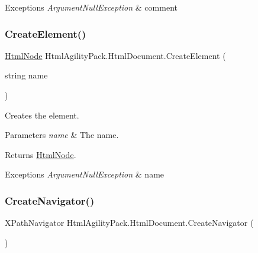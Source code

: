 \begin{DoxyExceptions}{Exceptions}
{\em Argument\+Null\+Exception} & comment\\
\hline
\end{DoxyExceptions}
\mbox{\label{class_html_agility_pack_1_1_html_document_a0bf47c03adde8bcd9f5c163f0e6d44b9}} 
\subsubsection{\texorpdfstring{Create\+Element()}{CreateElement()}}
{\footnotesize\ttfamily \hyperlink{class_html_agility_pack_1_1_html_node}{Html\+Node} Html\+Agility\+Pack.\+Html\+Document.\+Create\+Element (\begin{DoxyParamCaption}\item[{string}]{name }\end{DoxyParamCaption})\hspace{0.3cm}{\ttfamily [inline]}}



Creates the element. 


\begin{DoxyParams}{Parameters}
{\em name} & The name.\\
\hline
\end{DoxyParams}
\begin{DoxyReturn}{Returns}
\hyperlink{class_html_agility_pack_1_1_html_node}{Html\+Node}.
\end{DoxyReturn}

\begin{DoxyExceptions}{Exceptions}
{\em Argument\+Null\+Exception} & name\\
\hline
\end{DoxyExceptions}
\mbox{\label{class_html_agility_pack_1_1_html_document_a6c0c82129a0452708f686a9ac329a0a5}} 
\subsubsection{\texorpdfstring{Create\+Navigator()}{CreateNavigator()}}
{\footnotesize\ttfamily X\+Path\+Navigator Html\+Agility\+Pack.\+Html\+Document.\+Create\+Navigator (\begin{DoxyParamCaption}{ }\end{DoxyParamCaption})\hspace{0.3cm}{\ttfamily [inline]}}



